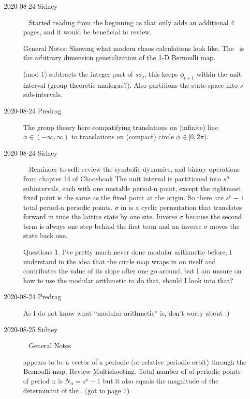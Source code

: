 \begin{description}
\item[2020-08-24 Sidney]~
Started reading from the beginning as that only adds an additional 4 pages, and it would be beneficial to review.

\vspace{3mm}

General Notes:
Showing what modern chaos calculations look like.
The \catlatt\ is the arbitrary dimension generalization of the 1-D Bernoulli map.

(mod 1) subtracts the integer part of $s\phi_t$, this keeps $\phi_{t+1}$
within the unit interval (group theoretic analogue?). Also partitions
the state-space into $s$ sub-intervals.

\item[2020-08-24 Predrag]
The group theory here compatifying translations on (infinite) line
$\phi\in(-\infty,\infty)$ to translations on (compact) circle
$\phi\in[0,2\pi)$.

\item[2020-08-24 Sidney]~
Reminder to self: review the symbolic dynamics, and binary operations from chapter 14 of Chaosbook
The unit interval is partitioned into $s^n$ subintervals, each with one unstable period-n point, except the rightmost fixed point is the same as the fixed point at the origin. So there are $s^n-1$ total period-n periodic points.
$\sigma$ in  is a cyclic permutation that translates forward in time the lattice state by one site. Inverse $\sigma$ because the second term is always one step behind the first term and an inverse $\sigma$ moves the state back one.
\vspace{3mm}

Questions
1. I've pretty much never done modular arithmetic before, I understand  in the idea that the circle map wraps in on itself and contributes the value of its slope after one go around, but I am unsure on how to use the modular arithmetic to do that, should I look into that?

\item[2020-08-24 Predrag]
As I do not know what ``modular arithmetic'' is, don't worry about :)

\item[2020-08-25 Sidney]~
General Notes

 appears to be a vector of a periodic (or relative
periodic orbit) through the Bernoulli map. Review Multishooting. Total
number of of periodic points of period n is $N_n=s^n-1$ but it also
equals the magnitude of the determinant of the {\jacobianOrb}.
(got to page 7)


\end{description}
